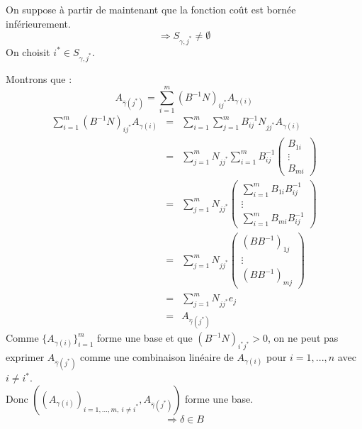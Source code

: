 On suppose à partir de maintenant que la fonction coût est bornée inférieurement.
	\[\Rightarrow S_{\gamma,j^*}\neq \emptyset\]
On choisit $i^*\in S_{\gamma,j^*}$.


\begin{dem}
Montrons que :
	\[A_{\hat{\gamma}(j^*)}=\sum_{i=1}^m (B^{-1}N)_{ij^*}A_{\gamma(i)}\]
\begin{eqnarray*}
	\sum_{i=1}^m (B^{-1}N)_{ij^*}A_{\gamma(i)}&=&\sum_{i=1}^m \sum_{j=1}^m B^{-1}_{ij}N_{jj^*}A_{\gamma(i)}\\
			&=&\sum_{j=1}^m N_{jj^*} \sum_{i=1}^m B^{-1}_{ij}\begin{pmatrix} B_{1i}\\ \vdots \\ B_{mi} \end{pmatrix} \\
			&=&\sum_{j=1}^m N_{jj^*} \begin{pmatrix} \sum_{i=1}^m B_{1i}B^{-1}_{ij} \\ \vdots \\ \sum_{i=1}^m B_{mi}B^{-1}_{ij} \end{pmatrix} \\
			&=&\sum_{j=1}^m N_{jj^*} \begin{pmatrix} (BB^{-1})_{1j} \\ \vdots \\ (BB^{-1})_{mj} \end{pmatrix}\\
			&=&\sum_{j=1}^m N_{jj^*}e_j \\
			&=&A_{\hat{\gamma}(j^*)}
\end{eqnarray*}
Comme $\{A_{\gamma(i)}\}_{i=1}^m$ forme une base et que $(B^{-1}N)_{i^*j^*}>0$, on ne peut pas exprimer $A_{\hat{\gamma}(j^*)}$ comme une combinaison linéaire de $A_{\gamma(i)}$ pour $i=1,...,n$ avec $i\neq i^*$. \\
Donc $((A_{\gamma(i)})_{i=1,...,m,\ i\neq i^*},A_{\hat{\gamma}(j^*)})$ forme une base.
	\[\Rightarrow \delta \in B\]
\end{dem}


